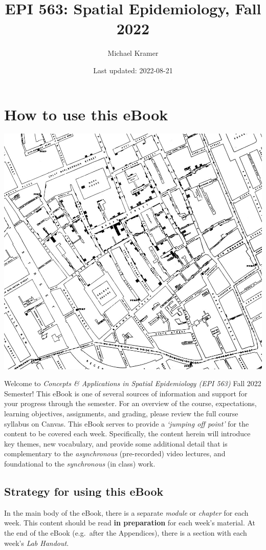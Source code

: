 \documentclass[
]{book}
\title{EPI 563: Spatial Epidemiology, Fall 2022}
\author{Michael Kramer}
\date{Last updated: 2022-08-21}
\begin{document}
\maketitle

{
\setcounter{tocdepth}{2}
\tableofcontents
}
\hypertarget{how-to-use-this-ebook}{%
\chapter*{How to use this eBook}\label{how-to-use-this-ebook}}

\begin{center}\includegraphics[width=0.5\linewidth]{images/John-Snows-cholera-map-of-009} \end{center}

Welcome to \emph{Concepts \& Applications in Spatial Epidemiology (EPI 563)} Fall 2022 Semester! This eBook is one of several sources of information and support for your progress through the semester. For an overview of the course, expectations, learning objectives, assignments, and grading, please review the full course syllabus on Canvas. This eBook serves to provide a \emph{`jumping off point'} for the content to be covered each week. Specifically, the content herein will introduce key themes, new vocabulary, and provide some additional detail that is complementary to the \emph{asynchronous} (pre-recorded) video lectures, and foundational to the \emph{synchronous} (in class) work.

\hypertarget{strategy-for-using-this-ebook}{%
\section*{Strategy for using this eBook}\label{strategy-for-using-this-ebook}}

In the main body of the eBook, there is a separate \emph{module} or \emph{chapter} for each week. This content should be read \textbf{in preparation} for each week's material. At the end of the eBook (e.g.~after the Appendices), there is a section with each week's \emph{Lab Handout}.
\end{document}
